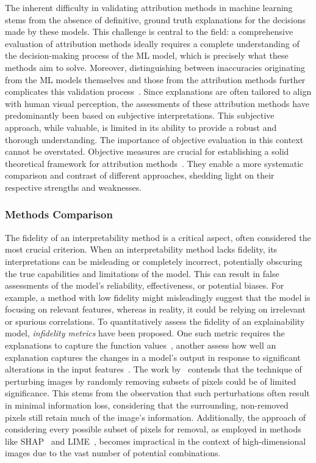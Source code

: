 The inherent difficulty in validating attribution methods in machine learning stems from the absence of definitive, ground truth explanations for the decisions made by these models. This challenge is central to the field: a comprehensive evaluation of attribution methods ideally requires a complete understanding of the decision-making process of the ML model, which is precisely what these methods aim to solve. Moreover, distinguishing between inaccuracies originating from the ML models themselves and those from the attribution methods further complicates this validation process~\cite{SundararajanTY17}. Since explanations are often tailored to align with human visual perception, the assessments of these attribution methods have predominantly been based on subjective interpretations. This subjective approach, while valuable, is limited in its ability to provide a robust and thorough understanding. The importance of objective evaluation in this context cannot be overstated. Objective measures are crucial for establishing a solid theoretical framework for attribution methods~\cite{yeh2019infidelity}. They enable a more systematic comparison and contrast of different approaches, shedding light on their respective strengths and weaknesses. 

\subsubsection{Methods Comparison}
\label{sec:comp}

The fidelity of an interpretability method is a critical aspect, often considered the most crucial criterion. When an interpretability method lacks fidelity, its interpretations can be misleading or completely incorrect, potentially obscuring the true capabilities and limitations of the model. This can result in false assessments of the model's reliability, effectiveness, or potential biases. For example, a method with low fidelity might misleadingly suggest that the model is focusing on relevant features, whereas in reality, it could be relying on irrelevant or spurious correlations. To quantitatively assess the fidelity of an explainability model, \emph{infidelity metrics} have been proposed. One such metric requires the explanations to capture the function values~\cite{PlumbMT18}, another assess how well an explanation captures the changes in a model's output in response to significant alterations in the input features~\cite{YehHSIR19}. The work by~\cite{YehHSIR19} contends that the technique of perturbing images by randomly removing subsets of pixels could be of limited significance. This stems from the observation that such perturbations often result in minimal information loss, considering that the surrounding, non-removed pixels still retain much of the image's information. Additionally, the approach of considering every possible subset of pixels for removal, as employed in methods like SHAP~\cite{LundbergL17} and LIME~\cite{Ribeiro0G16}, becomes impractical in the context of high-dimensional images due to the vast number of potential combinations.


